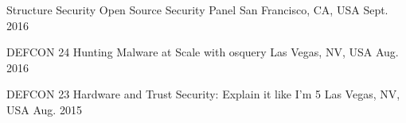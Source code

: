 \begin{cvhonors}
\cvhonor
{Structure Security} %
{Open Source Security Panel} %
{San Francisco, CA, USA} %
{Sept. 2016} %


\cvhonor
{DEFCON 24} %
{Hunting Malware at Scale with osquery} %
{Las Vegas, NV, USA} %
{Aug. 2016} %


\cvhonor
{DEFCON 23} %
{Hardware and Trust Security: Explain it like I’m 5} %
{Las Vegas, NV, USA} %
{Aug. 2015} %


\end{cvhonors}

